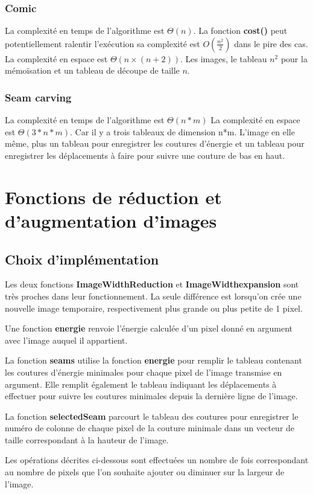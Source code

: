 \documentclass[10pt]{article}
\begin{document}
\subsubsection{Comic}
La complexité en temps de l'algorithme est $\Theta(n)$. La fonction \textbf{cost()} peut potentiellement ralentir l'exécution sa complexité est $O(\frac{n^2}{2})$ dans le pire des cas.
La complexité en espace est $\Theta(n \times (n+2))$. Les images, le tableau $n^2$ pour la mémoïsation et un tableau de découpe de taille $n$.
\subsubsection{Seam carving}
La complexité en temps de l'algorithme est $\Theta(n*m)$
La complexité en espace est $\Theta(3*n*m)$. Car il y a trois tableaux de dimension n*m. L'image en elle même, plus un tableau pour enregistrer les coutures d'énergie et un tableau pour enregistrer les déplacements à faire pour suivre une couture de bas en haut.

\section{Fonctions de réduction et d'augmentation d'images}
\subsection{Choix d'implémentation}
Les deux fonctions \textbf{ImageWidthReduction} et \textbf{ImageWidthexpansion} sont très proches dans leur fonctionnement. La seule différence est lorsqu'on crée une nouvelle image temporaire, respectivement plus grande ou plus petite de 1 pixel.

Une fonction \textbf{energie} renvoie l'énergie calculée d'un pixel donné en argument avec l'image auquel il appartient.

La fonction \textbf{seams} utilise la fonction \textbf{energie} pour remplir le tableau contenant les coutures d'énergie minimales pour chaque pixel de l'image transmise en argument. Elle remplit également le tableau indiquant les déplacements à effectuer pour suivre les coutures minimales depuis la dernière ligne de l'image.

La fonction \textbf{selectedSeam} parcourt le tableau  des coutures pour enregistrer le numéro de colonne de chaque pixel de la couture minimale dans un vecteur de taille correspondant à la hauteur de l'image. 

Les opérations décrites ci-dessous sont effectuées un nombre de fois correspondant au nombre de pixels que l'on souhaite ajouter ou diminuer sur la largeur de l'image.
\end{document}
